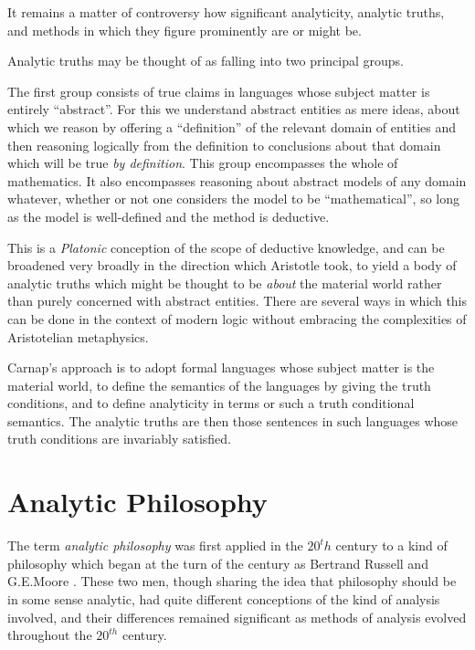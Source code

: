 It remains a matter of controversy how significant analyticity,
analytic truths, and methods in which they figure prominently are or
might be.

Analytic truths may be thought of as falling into two principal
groups.

The first group consists of true claims in languages whose subject
matter is entirely ``abstract''.
For this we understand abstract entities as mere ideas, about which we
reason by offering a ``definition'' of the relevant domain of entities
and then reasoning logically from the definition to conclusions about
that domain which will be true \emph{by definition}.
This group encompasses the whole of mathematics.
It also encompasses reasoning about abstract models of any domain
whatever, whether or not one considers the model to be
``mathematical'', so long as the model is well-defined and the method
is deductive.

This is a \emph{Platonic} conception of the scope of deductive
knowledge, and can be broadened very broadly in the direction which
Aristotle took, to yield a body of analytic truths which might be
thought to be \emph{about} the material world rather than purely
concerned with abstract entities.
There are several ways in which this can be done in the context of
modern logic without embracing the complexities of Aristotelian
metaphysics.

Carnap's approach is to adopt formal languages whose subject matter is
the material world, to define the semantics of the languages by giving
the truth conditions, and to define analyticity in terms or such a
truth conditional semantics.
The analytic truths are then those sentences in such languages whose
truth conditions are invariably satisfied.

\section{Analytic Philosophy}

The term \emph{analytic philosophy} was first applied in the $20^th$
century to a kind of philosophy which began at the turn of the century
as Bertrand Russell  and G.E.Moore
.
These two men, though sharing the idea that philosophy should be in
some sense analytic, had quite different conceptions of the kind of
analysis involved, and their differences remained significant as
methods of analysis evolved throughout the $20^{th}$ century.


